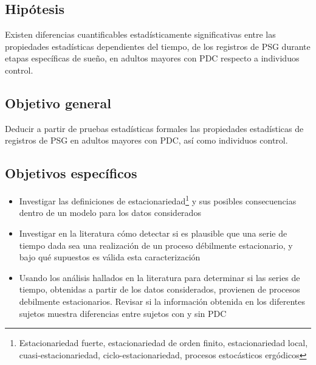 
\subsection{Hip\'otesis}

Existen diferencias cuantificables estad\'isticamente significativas entre las propiedades
estad\'isticas dependientes del tiempo, de los registros de PSG
durante etapas espec\'ificas de sue\~no, en adultos
mayores con PDC respecto a individuos control.


\subsection{Objetivo general}

Deducir a partir de pruebas estad\'isticas formales las propiedades
estad\'isticas de registros de PSG en adultos mayores con PDC, as\'i como individuos control.


\subsection{Objetivos espec\'ificos}

\begin{itemize}
\item Investigar las definiciones de estacionariedad\footnote{Estacionariedad fuerte, 
estacionariedad de orden finito, estacionariedad local, cuasi-estacionariedad,
ciclo-estacionariedad, procesos estoc\'asticos erg\'odicos} y sus posibles consecuencias dentro
de un modelo para los datos considerados

\item Investigar en la literatura c\'omo detectar si es plausible que una serie de tiempo 
dada sea una realizaci\'on de un proceso d\'ebilmente estacionario, 
y bajo qu\'e supuestos es v\'alida esta caracterizaci\'on

\item Usando los an\'alisis hallados en la literatura para determinar si las series de tiempo,
obtenidas a partir de los datos considerados, provienen de procesos
debilmente estacionarios.
Revisar si la informaci\'on obtenida en los diferentes sujetos muestra diferencias entre
sujetos con y sin PDC


\end{itemize}

